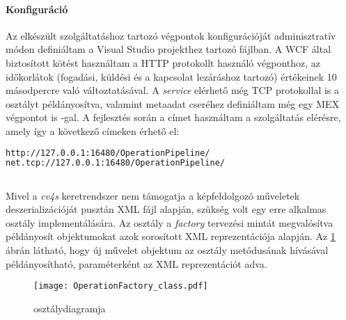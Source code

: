 \paragraph{Konfiguráció}

Az elkészült szolgáltatáshoz tartozó végpontok konfigurációját adminisztratív módon definiáltam a Visual Studio projekthez tartozó  fájlban. A WCF által biztosított  kötést használtam a HTTP protokollt használó végponthoz, az időkorlátok (fogadási, küldési és a kapcsolat lezáráshoz tartozó) értékeinek 10 másodpercre való változtatásával. A \emph{service} elérhető még TCP protokollal is a  osztályt példányosítva, valamint metaadat cseréhez definiáltam még egy MEX végpontot is -gal. A fejlesztés során a  címet használtam a szolgáltatás elérésre, amely így a következő címeken érhető el:

\begin{mdframed}[backgroundcolor=gray!20]
\begin{normalsize}
\begin{lstlisting}[language=XML]
http://127.0.0.1:16480/OperationPipeline/
net.tcp://127.0.0.1:16480/OperationPipeline/
\end{lstlisting}
\end{normalsize}
\end{mdframed}

\subsection{} \label{subs:op_factory}

Mivel a \emph{cv4s} keretrendszer nem támogatja a képfeldolgozó műveletek deszerializációját pusztán XML fájl alapján, szükség volt egy erre alkalmas osztály implementálására. Az  osztály a \emph{factory} tervezési mintát megvalósítva példányosít  objektumokat azok sorosított XML reprezentációja alapján. Az \ref{fig:OperationFactory_class} ábrán látható, hogy új művelet objektum az osztály  metódusának hívásával példányosítható, paraméterként az XML reprezentációt adva.

\begin{figure}[h]
\vspace{.5cm}
\texttt{[image: OperationFactory\_class.pdf]}
\centering
\vspace{.2cm}
\caption{ osztálydiagramja}
\vspace{.5cm}
\label{fig:OperationFactory_class}
\end{figure}

